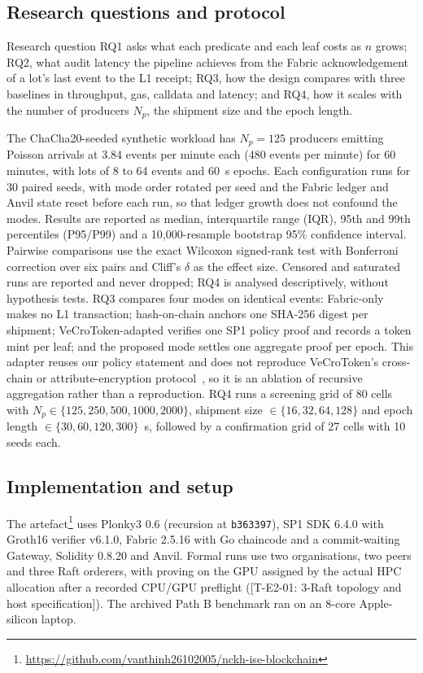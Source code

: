 \documentclass[runningheads]{llncs}
\newif\iffinal
\newcommand{\pending}[2]{\iffinal\errmessage{Unresolved pending result #1}\else{\color{red}[#1: #2]}\fi}
\newif\ifmarkrev
\newcommand{\rev}[1]{\ifmarkrev{\color{blue}#1}\else#1\fi}
\begin{document}
\subsection{Research questions and protocol}
Research question RQ1 asks what each predicate and each leaf costs as $n$ grows; RQ2, what audit latency the pipeline achieves from the Fabric acknowledgement of a lot's last event to the L1 receipt; RQ3, how the design compares with three baselines in throughput, gas, calldata and latency; and RQ4, how it scales with the number of producers $N_p$, the shipment size and the epoch length.

The ChaCha20-seeded synthetic workload has $N_p=125$ producers emitting Poisson arrivals at 3.84 events per minute each (480 events per minute) for 60 minutes, with lots of 8 to 64 events and 60~s epochs. Each configuration runs for 30 paired seeds, with mode order rotated per seed\rev{ and the Fabric ledger and Anvil state reset before each run, so that ledger growth does not confound the modes}. Results are reported as median, interquartile range (IQR), 95th and 99th percentiles (P95/P99) and a 10,000-resample bootstrap 95\% confidence interval. Pairwise comparisons use the exact Wilcoxon signed-rank test with Bonferroni correction over six pairs and Cliff's $\delta$ as the effect size. Censored and saturated runs are reported and never dropped\rev{; RQ4 is analysed descriptively, without hypothesis tests}. RQ3 compares four modes on identical events: Fabric-only makes no L1 transaction; hash-on-chain anchors one SHA-256 digest per shipment; VeCroToken-adapted verifies one SP1 policy proof and records a token mint per leaf; and the proposed mode settles one aggregate proof per epoch. This adapter reuses our policy statement and does not reproduce VeCroToken's cross-chain or attribute-encryption protocol~\cite{ding2026vecrotoken}\rev{, so it is an ablation of recursive aggregation rather than a reproduction}. RQ4 runs a screening grid of 80 cells with $N_p\in\{125,250,500,1000,2000\}$, shipment size $\in\{16,32,64,128\}$ and epoch length $\in\{30,60,120,300\}$~s, followed by a confirmation grid of 27 cells with 10 seeds each.

\subsection{Implementation and setup}
The artefact\footnote{\url{https://github.com/vanthinh26102005/nckh-ise-blockchain}} uses Plonky3 0.6 (recursion at \texttt{b363397}), SP1 SDK 6.4.0 with Groth16 verifier v6.1.0, Fabric 2.5.16 with Go chaincode and a commit-waiting Gateway, Solidity 0.8.20 and Anvil. Formal runs use two organisations, two peers and three Raft orderers, with proving on the GPU assigned by the actual HPC allocation after a recorded CPU/GPU preflight (\pending{T-E2-01}{3-Raft topology and host specification}). The archived Path B benchmark ran on an 8-core Apple-silicon laptop.
\end{document}
